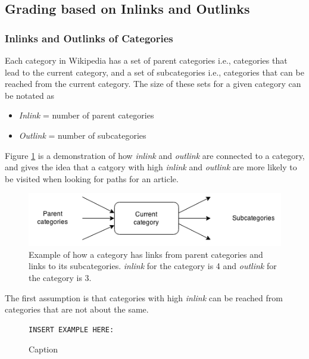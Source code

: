 \subsection{Grading based on Inlinks and Outlinks} %
\subsubsection{Inlinks and Outlinks of Categories}
Each category in Wikipedia has a set of parent categories i.e., categories that lead to the current category, and a set of subcategories i.e., categories that can be reached from the current category. The size of these sets for a given category can be notated as 
\begin{itemize}
\item \emph{Inlink} = number of parent categories
\item \emph{Outlink} = number of subcategories
\end{itemize}
Figure \ref{fig:Categorywparentandsub} is a demonstration of how  \emph{inlink} and \emph{outlink} are connected to a category, and gives the idea that a catgory with high \emph{inlink} and \emph{outlink} are more likely to be visited when looking for paths for an article. 
\begin{figure}[h]
\centering
\includegraphics[width=\textwidth]{Chapters/Implementation/Grading/category_parent_sub}
\caption[Example of \emph{inlink} and \emph{outlink} for a category]{Example of how a category has links from parent categories and links to its subcategories. \emph{inlink} for the category is 4 and \emph{outlink} for the category is 3.}
\label{fig:Categorywparentandsub}
\end{figure}


The first assumption is that categories with high \emph{inlink} can be reached from categories that are not about the same. 

\begin{figure}[h]
\centering
\begin{lstlisting}
INSERT EXAMPLE HERE: 
\end{lstlisting}
\caption{Caption}
\label{fig:my_label}
\end{figure}


